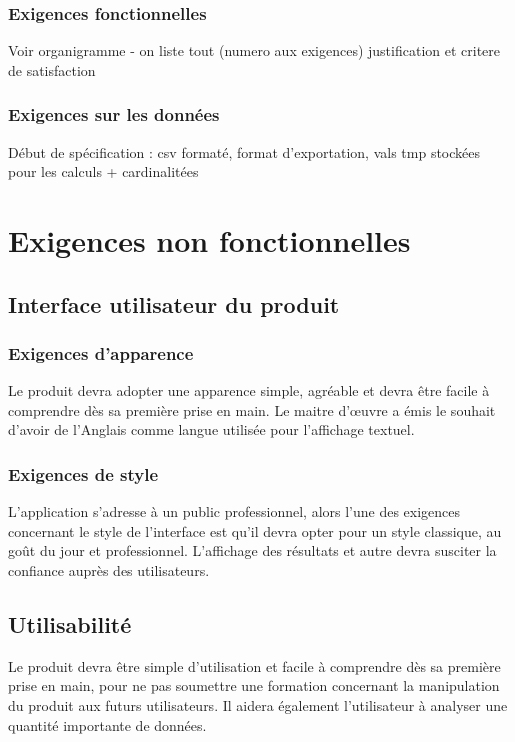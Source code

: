 			\subsubsection{Exigences fonctionnelles}
				{\color{red} Voir organigramme - on liste tout (numero aux exigences) justification et critere de satisfaction }
				
			\subsubsection{Exigences sur les données}
				{\color{red} Début de spécification : csv formaté, format d'exportation, vals tmp stockées pour les calculs + cardinalitées}
	
	
	\section{Exigences non fonctionnelles}
		\subsection{Interface utilisateur du produit}
		
			\subsubsection{Exigences d’apparence} 
			Le produit devra adopter une apparence simple, agréable et devra être facile à comprendre dès sa première prise en main.
			Le maitre d’œuvre a émis le souhait d’avoir de l’Anglais comme langue utilisée pour l’affichage textuel.

			\subsubsection{Exigences de style}
			L’application s’adresse à un public professionnel, alors l’une des exigences concernant le style de l’interface est qu’il devra opter pour un style classique, au goût du jour et professionnel. L’affichage des résultats et autre devra susciter la confiance auprès des utilisateurs.

		\subsection{Utilisabilité}
		Le produit devra être simple d’utilisation et facile à comprendre dès sa première prise en main, pour ne pas soumettre une formation concernant la manipulation du produit aux futurs utilisateurs.
		Il aidera également l’utilisateur à analyser une quantité importante de données.

